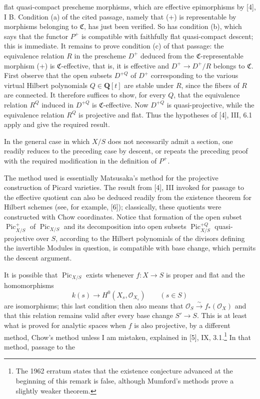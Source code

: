 flat quasi-compact prescheme morphisms, which are effective epimorphisms by
[4], I B. Condition (a) of the cited passage, namely that (+) is representable
by morphisms belonging to $\mathfrak C$, has just been verified. So has
condition (b), which says that the functor $P^+$ is compatible with faithfully
flat quasi-compact descent; this is immediate. It remains to prove condition
(c) of that passage: the equivalence relation $R$ in the prescheme $D^+$
deduced from the $\mathfrak C$-representable morphism (+) is
$\mathfrak C$-effective, that is, it is effective and
$D^+\longrightarrow D^+/R$ belongs to $\mathfrak C$. First observe that the
open subsets $D^{+Q}$ of $D^+$ corresponding to the various virtual Hilbert
polynomials $Q\in\mathbf Q[t]$ are stable under $R$, since the fibers of $R$
are connected. It therefore suffices to show, for every $Q$, that the
equivalence relation $R^Q$ induced in $D^{+Q}$ is $\mathfrak C$-effective.
Now $D^{+Q}$ is quasi-projective, while the equivalence relation $R^Q$ is
projective and flat. Thus the hypotheses of [4], III, 6.1 apply and give the
required result.

In the general case in which $X/S$ does not necessarily admit a section, one
readily reduces to the preceding case by descent, or repeats the preceding
proof with the required modification in the definition of $P^+$.

 The method used is essentially Matsusaka's method for the
projective construction of Picard varieties. The result from [4], III invoked
for passage to the effective quotient can also be deduced readily from the
existence theorem for Hilbert schemes (see, for example, [6]); classically,
these quotients were constructed with Chow coordinates. Notice that formation
of the open subset $\operatorname{Pic}^{+}_{X/S}$ of
$\operatorname{Pic}_{X/S}$ and its decomposition into open subsets
$\operatorname{Pic}^{+Q}_{X/S}$ quasi-projective over $S$, according to the
Hilbert polynomials of the divisors defining the invertible Modules in
question, is compatible with base change, which permits the descent argument.

 It is possible that $\operatorname{Pic}_{X/S}$ exists
whenever $f:X\longrightarrow S$ is proper and flat and the homomorphisms
\[
k(s)\longrightarrow H^0(X_s,\mathcal O_{X_s})\qquad(s\in S)
\]
are isomorphisms; this last condition then also means that
$\mathcal O_S\xrightarrow{\sim}f_*(\mathcal O_X)$ and that this relation
remains valid after every base change $S'\longrightarrow S$. This is at least
what is proved for analytic spaces when $f$ is also projective, by a different
method, Chow's method unless I am mistaken, explained in [5], IX,
3.1.\footnote{The 1962 erratum states that the existence conjecture advanced
at the beginning of this remark is false, although Mumford's methods prove a
slightly weaker theorem.} In that method, passage to the


